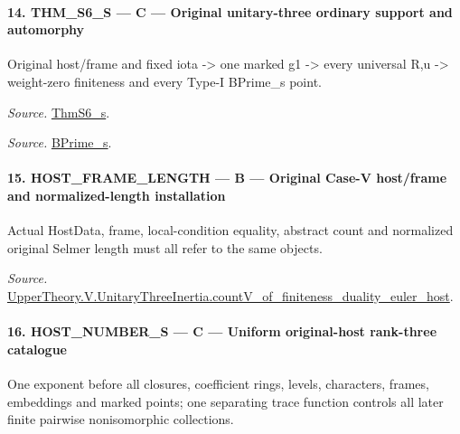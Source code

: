 \paragraph{14. THM\_\allowbreak S6\_\allowbreak S — C — Original unitary-three ordinary support and automorphy}

Original host/frame and fixed iota -> one marked g1 -> every universal R,u -> weight-zero finiteness and every Type-I BPrime\_\allowbreak s point.

\emph{Source.} \href{https://github.com/CocoSgt/riemann-hypothesis-lean/blob/7cbf7a0c32fca1badf05931879a37c3f8a2b03b4/src/Development/AutomorphicArithmetic/AutomorphicVarieties/ModularityArgument/ThresholdArguments/DenseThresholdCases/ThmS6CoreS.lean#L17-L26}{ThmS6\_\allowbreak s}.

\emph{Source.} \href{https://github.com/CocoSgt/riemann-hypothesis-lean/blob/7cbf7a0c32fca1badf05931879a37c3f8a2b03b4/src/Development/AutomorphicArithmetic/AutomorphicVarieties/ModularityArgument/ThresholdArguments/DenseThresholdCases/ThmS6CoreS.lean#L12-L16}{BPrime\_\allowbreak s}.



\paragraph{15. HOST\_\allowbreak FRAME\_\allowbreak LENGTH — B — Original Case-V host/frame and normalized-length installation}

Actual HostData, frame, local-condition equality, abstract count and normalized original Selmer length must all refer to the same objects.

\emph{Source.} \href{https://github.com/CocoSgt/riemann-hypothesis-lean/blob/7cbf7a0c32fca1badf05931879a37c3f8a2b03b4/src/Development/AutomorphicArithmetic/AutomorphicVarieties/ModularityArgument/ThresholdArguments/DenseThresholdCases/CountVOf.lean#L33-L60}{UpperTheory.V.UnitaryThreeInertia.countV\_\allowbreak of\_\allowbreak finiteness\_\allowbreak duality\_\allowbreak euler\_\allowbreak host}.



\paragraph{16. HOST\_\allowbreak NUMBER\_\allowbreak S — C — Uniform original-host rank-three catalogue}

One exponent before all closures, coefficient rings, levels, characters, frames, embeddings and marked points; one separating trace function controls all later finite pairwise nonisomorphic collections.

